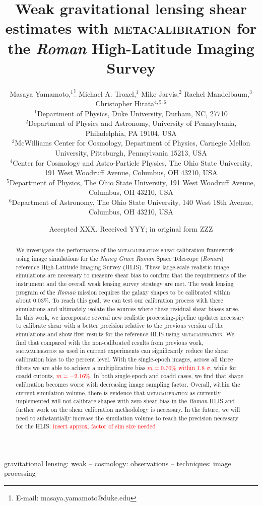 \documentclass[fleqn,usenatbib]{mnras}
\title[Metacalibration with The Roman High-Latitude Imaging Survey]{Weak gravitational lensing shear estimates with \textsc{metacalibration} for the \emph{Roman} High-Latitude Imaging Survey}
\author[M. Yamamoto et al.]{
Masaya Yamamoto,$^{1}$\thanks{E-mail: masaya.yamamoto@duke.edu}
Michael A. Troxel,$^{1}$
Mike Jarvis,$^{2}$
Rachel Mandelbaum,$^{3}$
Christopher Hirata$^{4,5,6}$
\\
$^{1}$Department of Physics, Duke University, Durham, NC, 27710\\
$^{2}$Department of Physics and Astronomy, University of Pennsylvania, Philadelphia, PA 19104, USA\\
$^{3}$McWilliams Center for Cosmology, Department of Physics, Carnegie Mellon University, Pittsburgh, Pennsylvania 15213, USA\\
$^{4}$Center for Cosmology and Astro-Particle Physics, The Ohio State University, 191 West Woodruff Avenue, Columbus, OH 43210, USA\\
$^{5}$Department of Physics, The Ohio State University, 191 West Woodruff Avenue, Columbus, OH 43210, USA\\
$^{6}$Department of Astronomy, The Ohio State University, 140 West 18th Avenue, Columbus, OH 43210, USA\\
}
\date{Accepted XXX. Received YYY; in original form ZZZ}
\begin{document}
\label{firstpage}
\pagerange{\pageref{firstpage}--\pageref{lastpage}}
\maketitle

\begin{abstract}
We investigate the performance of the \textsc{metacalibration} shear calibration framework using image simulations for the \emph{Nancy Grace Roman} Space Telescope (\emph{Roman}) reference High-Latitude Imaging Survey (HLIS). These large-scale realistic image simulations are necessary to measure shear bias to confirm that the requirements of the instrument and the overall weak lensing survey strategy are met. The weak lensing program of the \emph{Roman} mission requires the galaxy shapes to be calibrated within about 0.03\%. To reach this goal, we can test our calibration process with these simulations and ultimately isolate the sources where these residual shear biases arise. In this work, we incorporate several new realistic processing-pipeline updates necessary to calibrate shear with a better precision relative to the previous version of the simulations and show first results for the reference HLIS using \textsc{metacalibration}. We find that compared with the non-calibrated results from previous work, \textsc{metacalibration} as used in current experiments can significantly reduce the shear calibration bias to the percent level. With the single-epoch images, across all three filters we are able to achieve a multiplicative bias \textcolor{red}{$m=0.70\%$ within 1.8 $\sigma$}, while for coadd cutouts, \textcolor{red}{$m=-2.16\%$}. In both single-epoch and coadd cases, we find that shape calibration becomes worse with decreasing image sampling factor. Overall, within the current simulation volume, there is evidence that \textsc{metacalibration} as currently implemented will not calibrate shapes with zero shear bias in the \emph{Roman} HLIS and further work on the shear calibration methodology is necessary. In the future, we will need to substantially increase the simulation volume to reach the precision necessary for the HLIS. \textcolor{red}{insert approx. factor of sim size needed}
\end{abstract}

\begin{keywords}
gravitational lensing: weak -- cosmology: observations -- techniques: image processing
\end{keywords}
\end{document}
